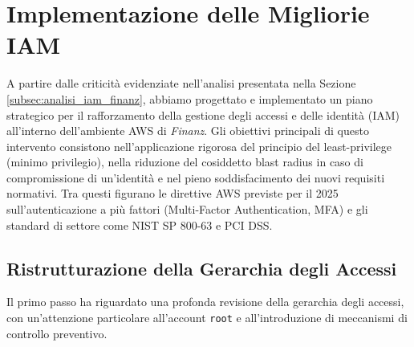 \section{Implementazione delle Migliorie IAM}
\label{sec:implementazione_migliorie_iam}

A partire dalle criticità evidenziate nell'analisi presentata nella Sezione \ref{subsec:analisi_iam_finanz}, abbiamo progettato e implementato un piano strategico per il rafforzamento della gestione degli accessi e delle identità (IAM) all'interno dell'ambiente AWS di \emph{Finanz}. Gli obiettivi principali di questo intervento consistono nell'applicazione rigorosa del principio del least-privilege (minimo privilegio), nella riduzione del cosiddetto blast radius in caso di compromissione di un'identità e nel pieno soddisfacimento dei nuovi requisiti normativi. Tra questi figurano le direttive AWS previste per il 2025 sull'autenticazione a più fattori (Multi-Factor Authentication, MFA) e gli standard di settore come NIST SP 800-63 e PCI DSS.

\subsection{Ristrutturazione della Gerarchia degli Accessi}
Il primo passo ha riguardato una profonda revisione della gerarchia degli accessi, con un'attenzione particolare all'account \texttt{root} e all'introduzione di meccanismi di controllo preventivo.

